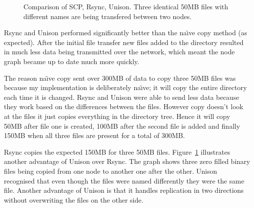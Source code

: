 \documentclass[12pt]{article}
\begin{document}
\begin{figure}[htp]
    \caption{Comparison of SCP, Rsync, Unison. Three identical 50MB files 
    with different names are being transfered between two nodes.}
    \label{fig:point_comp_graph}
\end{figure}

Rsync and Unison performed significantly better
than the na\"{\i}ve copy method (as expected). After the initial file
transfer new files added to the directory resulted in much less data
being transmitted over the network, which meant the node graph
became up to date much more quickly.

The reason na\"{\i}ve copy sent over 300MB of data to copy three 50MB
files was because my implementation is deliberately na\"{\i}ve; it will
copy the entire directory each time it is changed. Rsync and
Unison were able to send less data because they work based on the
differences between the files. However copy doesn't look at
the files it just copies everything in the directory tree.
Hence it will copy 50MB after file one is created, 100MB after
the second file is added and finally 150MB when all three
files are present for a total of 300MB.

Rsync copies the expected 150MB for three 50MB files.
Figure~\ref{fig:point_comp_graph} illustrates another advantage
of Unison over Rsync. The graph shows three zero filled
binary files being copied from one node to another one after
the other. Unison recognised that even though the files were named
differently they were the same file. Another advantage of Unison
is that it handles replication in two directions without
overwriting the files on the other side.
\end{document}
